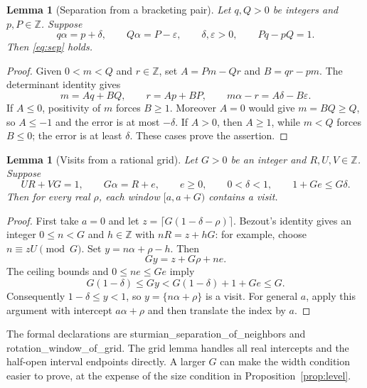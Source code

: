 \documentclass[11pt]{article}
\newtheorem{lemma}[theorem]{Lemma}
\theoremstyle{remark}
\newcommand{\Z}{\mathbb Z}
\newcommand{\fr}[1]{\{#1\}}
\newcommand{\code}[1]{{\small\ttfamily #1}}
\begin{document}
\begin{lemma}[Separation from a bracketing pair]\label{lem:neighbors}
Let $q,Q>0$ be integers and $p,P\in\Z$. Suppose
\[
q\alpha=p+\delta,\qquad Q\alpha=P-\varepsilon,\qquad
\delta,\varepsilon>0,\qquad Pq-pQ=1.
\]
Then \eqref{eq:sep} holds.
\end{lemma}
\begin{proof}
Given $0<m<Q$ and $r\in\Z$, set
$A=Pm-Qr$ and $B=qr-pm$. The determinant identity gives
\[
m=Aq+BQ,\qquad r=Ap+BP,\qquad m\alpha-r=A\delta-B\varepsilon.
\]
If $A\le0$, positivity of $m$ forces $B\ge1$. Moreover $A=0$ would give
$m=BQ\ge Q$, so $A\le-1$ and the error is at most $-\delta$.
If $A>0$, then $A\ge1$, while $m<Q$ forces $B\le0$; the error is at
least $\delta$. These cases prove the assertion.
\end{proof}

\begin{lemma}[Visits from a rational grid]\label{lem:grid}
Let $G>0$ be an integer and $R,U,V\in\Z$. Suppose
\begin{equation}\label{eq:griddata}
UR+VG=1,\qquad G\alpha=R+e,\qquad e\ge0,
\qquad 0<\delta<1,\qquad 1+Ge\le G\delta.
\end{equation}
Then for every real $\rho$, each window $[a,a+G)$ contains a visit.
\end{lemma}
\begin{proof}
First take $a=0$ and let $z=\lceil G(1-\delta-\rho)\rceil$.
Bezout's identity gives an integer $0\le n<G$ and $h\in\Z$ with
$nR=z+hG$: for example, choose $n\equiv zU\pmod G$.
Set $y=n\alpha+\rho-h$. Then
\[
Gy=z+G\rho+ne.
\]
The ceiling bounds and $0\le ne\le Ge$ imply
\[
G(1-\delta)\le Gy<G(1-\delta)+1+Ge\le G.
\]
Consequently $1-\delta\le y<1$, so $y=\fr{n\alpha+\rho}$ is a visit.
For general $a$, apply this argument with intercept $a\alpha+\rho$ and
then translate the index by $a$.
\end{proof}
The formal declarations are \code{sturmian\_\allowbreak{}separation\_\allowbreak{}of\_\allowbreak{}neighbors}
and \code{rotation\_\allowbreak{}window\_\allowbreak{}of\_\allowbreak{}grid}. The grid lemma handles all real
intercepts and the half-open interval endpoints directly. A larger $G$
can make the width condition easier to prove, at the expense of the size
condition in Proposition~\ref{prop:level}.
\end{document}

